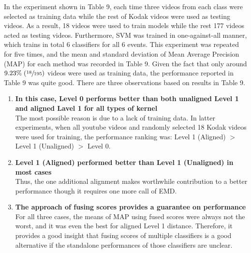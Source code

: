 \noindent In the experiment shown in Table 9, each time three videos from each class were selected as training data while the rest of Kodak videos were used as testing videos. As a result, 18 videos were used to train models while the rest 177 videos acted as testing videos. Furthermore, SVM was trained in one-against-all manner, which trains in total 6 classifiers for all 6 events. This experiment was repeated for five times, and the mean and standard deviation of Mean Average Precision (MAP) for each method was recorded in Table 9. Given the fact that only around $9.23\% \; (\sfrac{18}{195})$ videos were used as training data, the performance reported in Table 9 was quite good. There are three observations based on results in Table 9. 
\begin{enumerate}
  \item{\bf In this case, Level 0 performs better than both unaligned Level 1 and aligned Lavel 1 for all types of kernel} \\
  The most possible reason is due to a lack of training data. In latter experiments, when all youtube videos and randomly selected 18 Kodak videos were used for training, the performance ranking was: Level 1 (Aligned) $>$ Level 1 (Unaligned) $>$ Level 0. 

  \item{\bf Level 1 (Aligned) performed better than Level 1 (Unaligned) in most cases}\\
  Thus, the one additional alignment makes worthwhile contribution to a better performance though it requires one more call of EMD. 

  \item{\bf The approach of fusing scores provides a guarantee on performance}\\
  For all three cases, the means of MAP using fused scores were always not the worst, and it was even the best for aligned Level 1 distance. Therefore, it provides a good insight that fusing scores of multiple classifiers is a good alternative if the standalone performances of those classifiers are unclear.

\end{enumerate}

